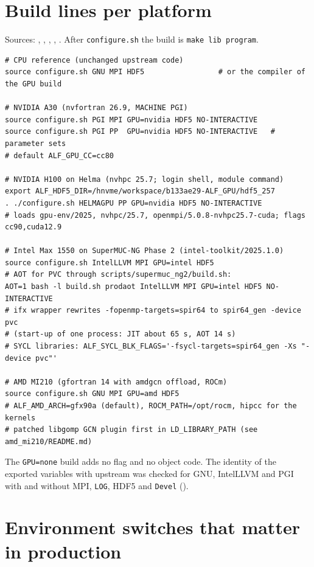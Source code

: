 \section{Build lines per platform}
\label{app:build}

Sources: , , , , . After \texttt{configure.sh} the build is \texttt{make lib program}.

\begin{small}
\begin{verbatim}
# CPU reference (unchanged upstream code)
source configure.sh GNU MPI HDF5                 # or the compiler of the GPU build

# NVIDIA A30 (nvfortran 26.9, MACHINE PGI)
source configure.sh PGI MPI GPU=nvidia HDF5 NO-INTERACTIVE
source configure.sh PGI PP  GPU=nvidia HDF5 NO-INTERACTIVE   # parameter sets
# default ALF_GPU_CC=cc80

# NVIDIA H100 on Helma (nvhpc 25.7; login shell, module command)
export ALF_HDF5_DIR=/hnvme/workspace/b133ae29-ALF_GPU/hdf5_257
. ./configure.sh HELMAGPU PP GPU=nvidia HDF5 NO-INTERACTIVE
# loads gpu-env/2025, nvhpc/25.7, openmpi/5.0.8-nvhpc25.7-cuda; flags cc90,cuda12.9

# Intel Max 1550 on SuperMUC-NG Phase 2 (intel-toolkit/2025.1.0)
source configure.sh IntelLLVM MPI GPU=intel HDF5
# AOT for PVC through scripts/supermuc_ng2/build.sh:
AOT=1 bash -l build.sh prodaot IntelLLVM MPI GPU=intel HDF5 NO-INTERACTIVE
# ifx wrapper rewrites -fopenmp-targets=spir64 to spir64_gen -device pvc
# (start-up of one process: JIT about 65 s, AOT 14 s)
# SYCL libraries: ALF_SYCL_BLK_FLAGS='-fsycl-targets=spir64_gen -Xs "-device pvc"'

# AMD MI210 (gfortran 14 with amdgcn offload, ROCm)
source configure.sh GNU MPI GPU=amd HDF5
# ALF_AMD_ARCH=gfx90a (default), ROCM_PATH=/opt/rocm, hipcc for the kernels
# patched libgomp GCN plugin first in LD_LIBRARY_PATH (see amd_mi210/README.md)
\end{verbatim}
\end{small}

The \texttt{GPU=none} build adds no flag and no object code. The identity of the exported variables with upstream was checked for GNU, IntelLLVM and PGI with and without MPI, \texttt{LOG}, HDF5 and \texttt{Devel} ().

\section{Environment switches that matter in production}
\label{app:env}

